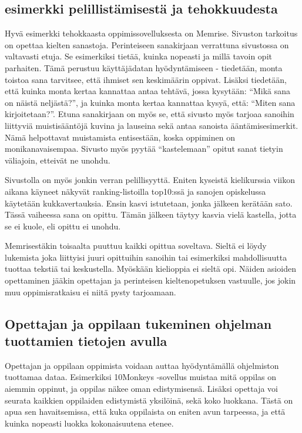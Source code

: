 \documentclass[utf8,bachelor]{gradu3}
\begin{document}
\subsection{esimerkki pelillistämisestä ja tehokkuudesta}
Hyvä esimerkki tehokkaasta oppimissovelluksesta on Memrise.\parencite[][]{memrise} Sivuston tarkoitus on opettaa kielten sanastoja. Perinteiseen sanakirjaan verrattuna sivustossa on valtavasti etuja. Se esimerkiksi tietää, kuinka nopeasti ja millä tavoin opit parhaiten. Tämä perustuu käyttäjädatan hyödyntämiseen - tiedetään, monta toistoa sana tarvitsee, että ihmiset sen keskimäärin oppivat. Lisäksi tiedetään, että kuinka monta kertaa kannattaa antaa tehtävä, jossa kysytään: “Mikä sana on näistä neljästä?”, ja kuinka monta kertaa kannattaa kysyä, että: “Miten sana kirjoitetaan?”. Etuna sanakirjaan on myös se, että sivusto myös tarjoaa sanoihin liittyviä muistisääntöjä kuvina ja lauseina sekä antaa sanoista ääntämisesimerkit. Nämä helpottavat muistamista entisestään, koska oppiminen on monikanavaisempaa. Sivusto myös pyytää “kastelemaan” opitut sanat tietyin väliajoin, etteivät ne unohdu.

Sivustolla on myös jonkin verran pelillisyyttä. Eniten kyseistä kielikurssia viikon aikana käyneet näkyvät ranking-listoilla top10:ssä ja sanojen opiskelussa käytetään kukkavertauksia. Ensin kasvi istutetaan, jonka jälkeen kerätään sato. Tässä vaiheessa sana on opittu. Tämän jälkeen täytyy kasvia vielä kastella, jotta se ei kuole, eli opittu ei unohdu. 

Memrisestäkin toisaalta puuttuu kaikki opittua soveltava. Sieltä ei löydy lukemista joka liittyisi juuri opittuihin sanoihin tai esimerkiksi mahdollisuutta tuottaa tekstiä tai keskustella. Myöskään kielioppia ei sieltä opi. Näiden asioiden opettaminen jääkin opettajan ja perinteisen kieltenopetuksen vastuulle, jos jokin muu oppimisratkaisu ei niitä pysty tarjoamaan.

\subsection{Opettajan ja oppilaan tukeminen ohjelman tuottamien tietojen avulla}
Opettajan ja oppilaan oppimista voidaan auttaa hyödyntämällä ohjelmiston tuottamaa dataa. Esimerkiksi 10Monkeys -sovellus muistaa mitä oppilas on aiemmin oppinut, ja oppilas näkee oman edistymisensä. Lisäksi opettaja voi seurata kaikkien oppilaiden edistymistä yksilöinä, sekä koko luokkana. Tästä on apua sen havaitsemissa, että kuka oppilaista on eniten avun tarpeessa, ja että kuinka nopeasti luokka kokonaisuutena etenee.
\end{document}
